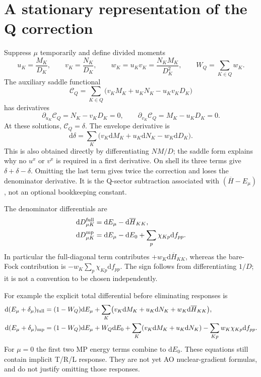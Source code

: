 \documentclass[11pt,letterpaper]{article}
\numberwithin{equation}{section}
\newcommand{\bH}{\overline H}
\newcommand{\dd}{\mathrm d}
\begin{document}
\section{A stationary representation of the Q correction}
Suppress $\mu$ temporarily and define divided moments
\begin{equation}
 u_K=\frac{M_K}{D_K},\qquad v_K=\frac{N_K}{D_K},\qquad
 w_K=u_Kv_K=\frac{N_KM_K}{D_K^2},\qquad W_Q=\sum_{K\in Q}w_K.
 \label{eq:divided}
\end{equation}
The auxiliary saddle functional
\begin{equation}
 \mathcal C_Q=\sum_{K\in Q}\bigl(v_KM_K+u_KN_K-u_Kv_KD_K\bigr)
 \label{eq:saddleQ}
\end{equation}
has derivatives
\begin{equation}
 \partial_{u_K}\mathcal C_Q=N_K-v_KD_K=0,\qquad
 \partial_{v_K}\mathcal C_Q=M_K-u_KD_K=0.
\end{equation}
At these solutions, $\mathcal C_Q=\delta$. The envelope derivative is
\begin{equation}
 \dd\delta=\sum_K\bigl(v_K\dd M_K+u_K\dd N_K-w_K\dd D_K\bigr).
 \label{eq:deltadifferential}
\end{equation}
This is also obtained directly by differentiating $NM/D$; the saddle form
explains why no $u^x$ or $v^x$ is required in a first derivative.
On shell its three terms give $\delta+\delta-\delta$. Omitting the last
term gives twice the correction and loses the denominator derivative.
It is the Q-sector subtraction associated with $(\bH-E_\mu)$, not an
optional bookkeeping constant.

The denominator differentials are
\begin{align}
 \dd D_{\mu K}^{\rm full}&=\dd E_\mu-\dd\bH_{KK},\\
 \dd D_{\mu K}^{\rm mp}&=\dd E_\mu-\dd E_0+
                                     \sum_p\chi_{Kp}\dd f_{pp}.
 \label{eq:dendifferentials}
\end{align}
In particular the full-diagonal term contributes $+w_K\dd\bH_{KK}$,
whereas the bare-Fock contribution is $-w_K\sum_p\chi_{Kp}\dd f_{pp}$.
The sign follows from differentiating $1/D$; it is not a convention to be
chosen independently.

For example the explicit total differential before eliminating responses is
\begin{align}
 \dd(E_\mu+\delta_\mu)_{\rm full}
   &=(1-W_Q)\dd E_\mu+
          \sum_K\bigl(v_K\dd M_K+u_K\dd N_K+w_K\dd\bH_{KK}\bigr),\\
 \dd(E_\mu+\delta_\mu)_{\rm mp}
   &=(1-W_Q)\dd E_\mu+W_Q\dd E_0+
      \sum_K(v_K\dd M_K+u_K\dd N_K)
      -\sum_{Kp}w_K\chi_{Kp}\dd f_{pp}.
 \label{eq:chainbeforeadjoint}
\end{align}
For $\mu=0$ the first two MP energy terms combine to $\dd E_0$.
These equations still contain implicit T/R/L response. They are not yet
AO nuclear-gradient formulas, and do not justify omitting those responses.
\end{document}
